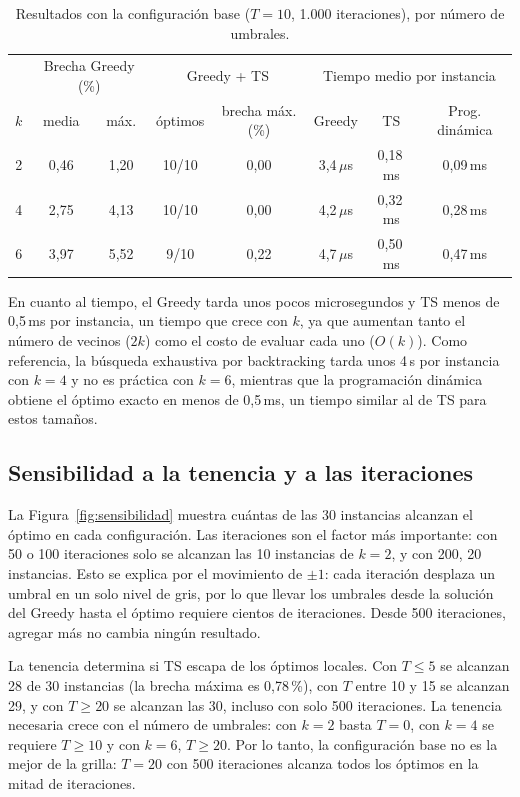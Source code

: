 \documentclass[letter, 10pt]{article}
\begin{document}
\begin{table}[h]
    \centering
    \small
    \begin{tabular}{c cc cc ccc}
        \hline
        & \multicolumn{2}{c}{Brecha Greedy (\%)} & \multicolumn{2}{c}{Greedy + TS} & \multicolumn{3}{c}{Tiempo medio por instancia} \\
        $k$ & media & máx. & óptimos & brecha máx. (\%) & Greedy & TS & Prog. dinámica \\
        \hline
        2 & 0,46 & 1,20 & 10/10 & 0,00 & 3,4\,$\mu$s & 0,18\,ms & 0,09\,ms \\
        4 & 2,75 & 4,13 & 10/10 & 0,00 & 4,2\,$\mu$s & 0,32\,ms & 0,28\,ms \\
        6 & 3,97 & 5,52 & 9/10 & 0,22 & 4,7\,$\mu$s & 0,50\,ms & 0,47\,ms \\
        \hline
    \end{tabular}
    \caption{Resultados con la configuración base ($T = 10$, 1.000 iteraciones), por número de umbrales.}
    \label{tab:base}
\end{table}

En cuanto al tiempo, el Greedy tarda unos pocos microsegundos y TS menos de 0,5\,ms por instancia, un tiempo que crece con $k$, ya que aumentan tanto el número de vecinos ($2k$) como el costo de evaluar cada uno ($O(k)$). Como referencia, la búsqueda exhaustiva por backtracking tarda unos 4\,s por instancia con $k = 4$ y no es práctica con $k = 6$, mientras que la programación dinámica obtiene el óptimo exacto en menos de 0,5\,ms, un tiempo similar al de TS para estos tamaños.

\subsection{Sensibilidad a la tenencia y a las iteraciones}
La Figura~\ref{fig:sensibilidad} muestra cuántas de las 30 instancias alcanzan el óptimo en cada configuración. Las iteraciones son el factor más importante: con 50 o 100 iteraciones solo se alcanzan las 10 instancias de $k = 2$, y con 200, 20 instancias. Esto se explica por el movimiento de $\pm 1$: cada iteración desplaza un umbral en un solo nivel de gris, por lo que llevar los umbrales desde la solución del Greedy hasta el óptimo requiere cientos de iteraciones. Desde 500 iteraciones, agregar más no cambia ningún resultado.

La tenencia determina si TS escapa de los óptimos locales. Con $T \leq 5$ se alcanzan 28 de 30 instancias (la brecha máxima es 0,78\,\%), con $T$ entre 10 y 15 se alcanzan 29, y con $T \geq 20$ se alcanzan las 30, incluso con solo 500 iteraciones. La tenencia necesaria crece con el número de umbrales: con $k = 2$ basta $T = 0$, con $k = 4$ se requiere $T \geq 10$ y con $k = 6$, $T \geq 20$. Por lo tanto, la configuración base no es la mejor de la grilla: $T = 20$ con 500 iteraciones alcanza todos los óptimos en la mitad de iteraciones.
\end{document}
